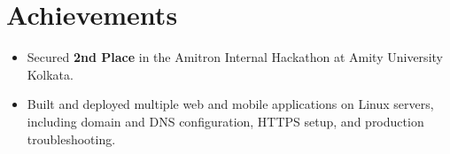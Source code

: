\documentclass[letterpaper,10pt]{article}
\newcommand{\resumeItem}[1]{
    \item\small{#1\vspace{-2pt}}
}
\newcommand{\resumeItemListStart}{\begin{itemize}[leftmargin=0.2in]}
\newcommand{\resumeItemListEnd}{\end{itemize}\vspace{-5pt}}
\begin{document}
\vspace{-4pt}

\section{Achievements}

\resumeItemListStart
    \resumeItem{Secured \textbf{2nd Place} in the Amitron Internal Hackathon at Amity University Kolkata.}
    \resumeItem{Built and deployed multiple web and mobile applications on Linux servers, including domain and DNS configuration, HTTPS setup, and production troubleshooting.}
\resumeItemListEnd

\end{document}
